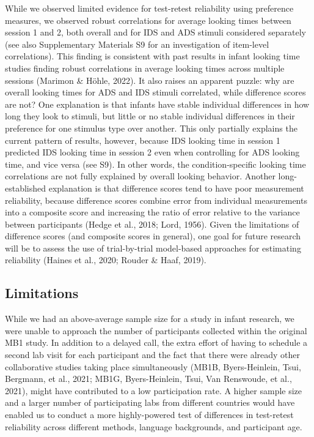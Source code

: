 \documentclass[
  english,
  man,floatsintext]{apa6}
\begin{document}
While we observed limited evidence for test-retest reliability using preference measures, we observed robust correlations for average looking times between session 1 and 2, both overall and for IDS and ADS stimuli considered separately (see also Supplementary Materials S9 for an investigation of item-level correlations).
This finding is consistent with past results in infant looking time studies finding robust correlations in average looking times across multiple sessions (Marimon \& Höhle, 2022).
It also raises an apparent puzzle: why are overall looking times for ADS and IDS stimuli correlated, while difference scores are not?
One explanation is that infants have stable individual differences in how long they look to stimuli, but little or no stable individual differences in their preference for one stimulus type over another.
This only partially explains the current pattern of results, however, because IDS looking time in session 1 predicted IDS looking time in session 2 even when controlling for ADS looking time, and vice versa (see S9).
In other words, the condition-specific looking time correlations are not fully explained by overall looking behavior.
Another long-established explanation is that difference scores tend to have poor measurement reliability, because difference scores combine error from individual measurements into a composite score and increasing the ratio of error relative to the variance between participants (Hedge et al., 2018; Lord, 1956).
Given the limitations of difference scores (and composite scores in general), one goal for future research will be to assess the use of trial-by-trial model-based approaches for estimating reliability (Haines et al., 2020; Rouder \& Haaf, 2019).

\hypertarget{limitations}{%
\subsection{Limitations}\label{limitations}}

While we had an above-average sample size for a study in infant research, we were unable to approach the number of participants collected within the original MB1 study.
In addition to a delayed call, the extra effort of having to schedule a second lab visit for each participant and the fact that there were already other collaborative studies taking place simultaneously (MB1B, Byers-Heinlein, Tsui, Bergmann, et al., 2021; MB1G, Byers-Heinlein, Tsui, Van Renswoude, et al., 2021), might have contributed to a low participation rate. A higher sample size and a larger number of participating labs from different countries would have enabled us to conduct a more highly-powered test of differences in test-retest reliability across different methods, language backgrounds, and participant age.
\end{document}
